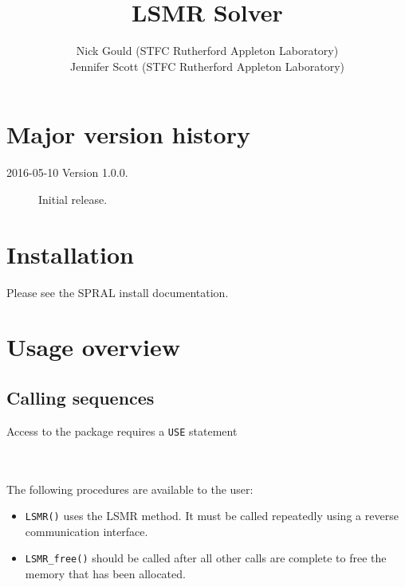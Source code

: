 \title{LSMR Solver}
\author{
   Nick Gould (STFC Rutherford Appleton Laboratory) \\
   Jennifer Scott (STFC Rutherford Appleton Laboratory)
}
\spralmaketitle
\thispagestyle{firststyle}

\newpage
\section*{Major version history}
\begin{description}
\item[2016-05-10 Version 1.0.0.] Initial release.
\end{description}


\section{Installation}
Please see the SPRAL install documentation. 


\section{Usage overview}

\subsection{Calling sequences}

Access to the package requires a {\tt USE} statement \\ \\
\indent\hspace{8mm}{\tt use spral\_LSMR} \\

\medskip

\noindent
The following procedures are available to the user:
\begin{itemize}
\item {\tt LSMR()} uses the LSMR method. It must be called repeatedly
using a reverse communication interface.
\item {\tt LSMR\_free()} should be called after all other calls are complete
to free the memory that has been allocated. 
\end{itemize}



